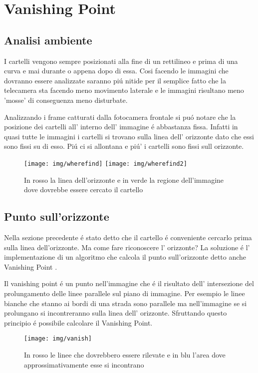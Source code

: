 \section{Vanishing Point}

	\subsection{Analisi ambiente}

		I cartelli vengono sempre posizionati alla fine di un rettilineo e prima di una curva e mai durante o appena dopo di essa. Cosi facendo le immagini che dovranno essere analizzate saranno pi\'u nitide per il semplice fatto che la telecamera sta facendo meno movimento laterale e le immagini risultano meno 'mosse' di conseguenza meno disturbate.

		Analizzando i frame catturati dalla fotocamera frontale si pu\'o notare che la posizione dei cartelli all' interno dell' immagine \'e abbastanza fissa. Infatti in quasi tutte le immagini i cartelli si trovano sulla linea dell' orizzonte dato che essi sono fissi su di esso. Pi\'u ci si allontana e pi\'u' i cartelli sono fissi sull orizzonte.
		\begin{figure}[!ht]
			\centering
			\texttt{[image: img/wherefind]}
			\texttt{[image: img/wherefind2]}
			\caption{In rosso la linea dell'orizzonte e in verde la regione dell'immagine dove dovrebbe essere cercato il cartello}
		\end{figure}


	\subsection{Punto sull'orizzonte}

		Nella sezione precedente \'e stato detto che il cartello \'e conveniente cercarlo prima sulla linea dell'orizzonte. Ma come fare riconoscere l' orizzonte? La soluzione \'e l' implementazione di un algoritmo che calcola il punto sull'orizzonte detto anche Vanishing Point \cite{vanish}.
		
		Il vanishing point \'e un punto nell'immagine che \'e il risultato  dell' intersezione del prolungamento delle linee parallele sul piano di immagine. Per esempio le linee bianche che stanno ai bordi di una strada sono parallele ma nell'immagine se si prolungano si incontreranno sulla linea dell' orizzonte. Sfruttando questo principio \'e possibile calcolare il Vanishing Point.
		\begin{figure}[!ht]
			\centering
			\texttt{[image: img/vanish]}
			\caption{In rosso le linee che dovrebbero essere rilevate e in blu l'area dove approssimativamente esse si incontrano}
		\end{figure}

